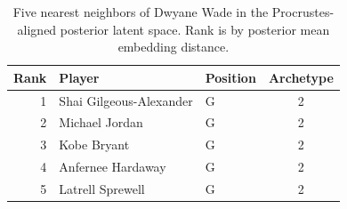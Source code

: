 \begin{table}[htbp]
  \centering\small
  \begin{tabular}{rllc}
    \toprule
    Rank & Player & Position & Archetype \\
    \midrule
    1 & Shai Gilgeous-Alexander & G & 2 \\
    2 & Michael Jordan & G & 2 \\
    3 & Kobe Bryant & G & 2 \\
    4 & Anfernee Hardaway & G & 2 \\
    5 & Latrell Sprewell & G & 2 \\
    \bottomrule
  \end{tabular}
  \caption{Five nearest neighbors of Dwyane Wade in the Procrustes-aligned posterior latent space. Rank is by posterior mean embedding distance.}
  \label{tab:Dwyane_Wade_neighbors}
\end{table}

